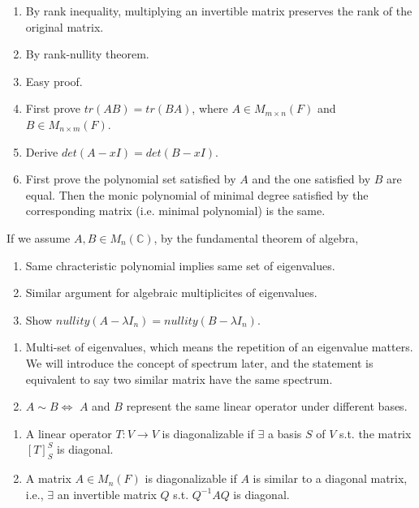 \documentclass[12pt]{article}
\begin{document}
\begin{pfbox}
\begin{enumerate}
    \item By rank inequality, multiplying an invertible matrix preserves the rank of the original matrix.
    \item By rank-nullity theorem.
    \item Easy proof.
    \item First prove $tr(AB)=tr(BA)$, where $A\in M_{m\times n}(F)$ and $B\in M_{n\times m}(F)$.
    \item Derive $det(A-xI)=det(B-xI)$.
    \item First prove the polynomial set satisfied by $A$ and the one satisfied by $B$ are equal. Then the monic polynomial of minimal degree satisfied by the corresponding matrix (i.e. minimal polynomial) is the same.
\end{enumerate}

If we assume $A,B\in M_n(\mathbb{C})$, by the fundamental theorem of algebra,
\begin{enumerate}
    \item Same chracteristic polynomial implies same set of eigenvalues.
    \item Similar argument for algebraic multiplicites of eigenvalues.
    \item Show $nullity(A-\lambda I_n)=nullity(B-\lambda I_n)$.
\end{enumerate}

\end{pfbox}



\begin{remark}
    \begin{enumerate}
        \item Multi-set of eigenvalues, which means the repetition of an eigenvalue matters. We will introduce the concept of spectrum later, and the statement is equivalent to say two similar matrix have the same spectrum.
        \item $A\sim B \Leftrightarrow$ $A$ and $B$ represent the same linear operator under different bases.
    \end{enumerate}
\end{remark}


\begin{definition}
    \begin{enumerate}
        \item A linear operator $T:V\rightarrow V$ is diagonalizable if $\exists$ a basis $S$ of $V$ s.t. the matrix $[T]^{S}_{S}$ is diagonal.
        \item A matrix $A\in M_n(F)$ is diagonalizable if $A$ is similar to a diagonal matrix, i.e., $\exists$ an invertible matrix $Q$ s.t. $Q^{-1}AQ$ is diagonal.
    \end{enumerate}
\end{definition}
\end{document}

